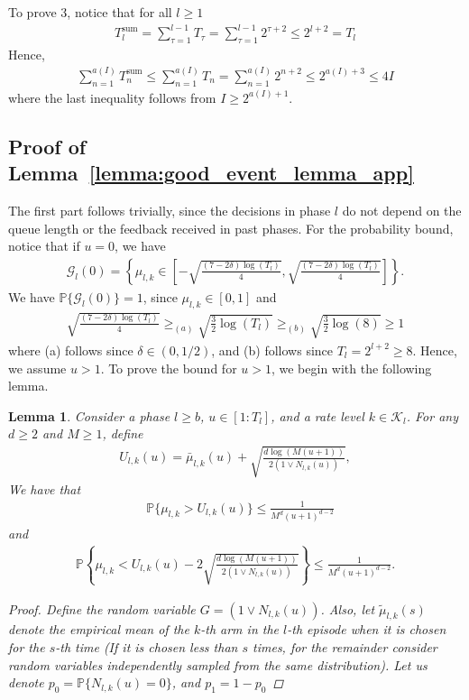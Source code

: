 \documentclass[12pt,draftcls, onecolumn]{IEEEtran}
\newtheorem{lemma}{Lemma}
\begin{document}
{To prove 3, notice that for all $l \geq 1$
\begin{align}
    T_l^{\text{sum}} = \sum_{\tau = 1}^{l-1} T_{\tau} = \sum_{\tau = 1}^{l-1}2^{\tau+2} \leq  2^{l+2} = T_l
\end{align}
Hence,
\begin{align}
    \sum_{n=1}^{a(I)} T^{\text{sum}}_n \leq \sum_{n=1}^{a(I)} T_n = \sum_{n=1}^{a(I)} 2^{n+2} \leq 2^{a(I)+3}\leq 4I\nonumber
\end{align}
where the last inequality follows from $I \geq 2^{a(I)+1}$.

\subsection{Proof of Lemma~\ref{lemma:good_event_lemma_app}}\label{app:good_event}
The first part follows trivially, since the decisions in phase $l$ do not depend on the queue length or the feedback received in past phases. For the probability bound, notice that if $u = 0$, we have
\begin{align}
    \mathcal{G}_l(0) = \left\{ \mu_{l,k} \in \left[-\sqrt{\frac{(7-2\delta)\log(T_l)}{4}},\sqrt{\frac{(7-2\delta)\log(T_l)}{4}}\right]\right\}.
\end{align}
We have $\mathbb{P}\{\mathcal{G}_l(0)\} = 1$, since $\mu_{l,k} \in [0,1]$ and
\begin{align}
    \sqrt{\frac{(7-2\delta)\log(T_l)}{4}} \geq_{(a)} \sqrt{\frac{3}{2}\log(T_l)} \geq_{(b)} \sqrt{\frac{3}{2}\log(8)} \geq 1
\end{align}
where (a) follows since $\delta \in (0,1/2)$, and (b) follows since $T_l = 2^{l+2} \geq 8$. Hence, we assume $u > 1$. To prove the bound for $u>1$, we begin with the following lemma.
\begin{lemma}\label{lemma:good_event_lemma}
    Consider a phase $l \geq b$, $u \in [1:T_l]$, and a \emph{rate level} $k \in \mathcal{K}_l$. For any $d \geq 2$ and $M \geq 1$, define \begin{align}
        U_{l,k}(u) = \bar{\mu}_{l,k}(u) + \sqrt{\frac{d\log(M(u+1))}{2(1 \vee N_{l,k}(u))}},  \nonumber
    \end{align}
    We have that
    \begin{align}
        &\mathbb{P}\{ \mu_{l,k} > U_{l,k}(u)\} \leq \frac{1}{M^d(u+1)^{d-2}}  \nonumber
    \end{align}
    and
    \begin{align}
        \mathbb{P}\left\{ \mu_{l,k} < U_{l,k}(u)-2\sqrt{\frac{d\log(M(u+1))}{2(1 \vee N_{l,k}(u))}}\right\} \leq \frac{1}{M^d(u+1)^{d-2}}. \nonumber
    \end{align}
    \begin{proof}
  Define the random variable $G = (1 \vee N_{l,k}(u))$. Also, let $\tilde{\mu}_{l,k}(s)$ denote the empirical mean of the $k$-th arm in the $l$-th episode when it is chosen for the $s$-th time (If it is chosen less than $s$ times, for the remainder consider random variables independently sampled from the same distribution). Let us denote $p_0 = \mathbb{P}\{N_{l,k}(u) = 0\}$, and $p_1 = 1-p_0$


\end{proof}
\end{lemma}}
\end{document}
